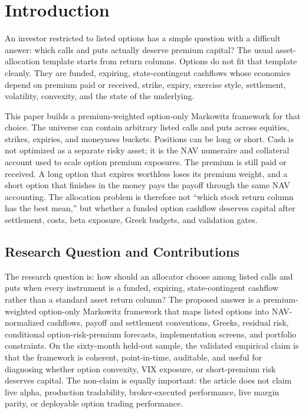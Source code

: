 \section{Introduction}\label{sec:intro}

An investor restricted to listed options has a simple question with a difficult answer:
which calls and puts actually deserve premium capital? The usual asset-allocation template
starts from return columns. Options do not fit that template cleanly. They are funded,
expiring, state-contingent cashflows whose economics depend on premium paid or received,
strike, expiry, exercise style, settlement, volatility, convexity, and the state of the
underlying.

This paper builds a premium-weighted option-only Markowitz framework for that choice. The
universe can contain arbitrary listed calls and puts across equities, strikes, expiries, and
moneyness buckets. Positions can be long or short. Cash is not optimized as a separate
risky asset; it is the NAV numeraire and collateral account used to scale option premium
exposures. The premium is still paid or received. A long option that expires worthless loses
its premium weight, and a short option that finishes in the money pays the payoff through
the same NAV accounting. The allocation problem is therefore not ``which stock return
column has the best mean,'' but whether a funded option cashflow deserves capital after
settlement, costs, beta exposure, Greek budgets, and validation gates.

\subsection{Research Question and Contributions}

The research question is: how should an allocator choose among listed calls and puts when
every instrument is a funded, expiring, state-contingent cashflow rather than a standard
asset return column? The proposed answer is a premium-weighted option-only Markowitz
framework that maps listed options into NAV-normalized cashflows, payoff and settlement
conventions, Greeks, residual risk, conditional option-risk-premium forecasts,
implementation screens, and portfolio constraints. On the sixty-month held-out sample, the
validated empirical claim is that the framework is coherent,
point-in-time, auditable, and useful for diagnosing whether option convexity, VIX exposure,
or short-premium risk deserves capital. The non-claim is equally important: the article does
not claim live alpha, production tradability, broker-executed performance, live margin
parity, or deployable option trading performance.


